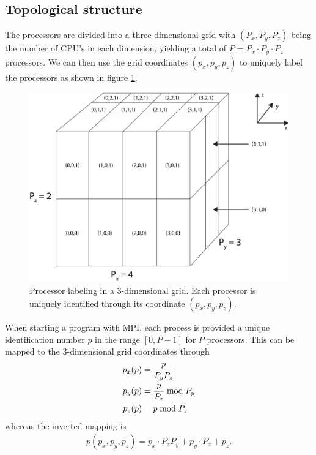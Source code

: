 \subsection{Topological structure}
The processors are divided into a three dimensional grid with $(P_x, P_y, P_z)$ being the number of CPU's in each dimension, yielding a total of $P = P_x\cdot P_y\cdot P_z$ processors. We can then use the grid coordinates $(p_x, p_y, p_z)$ to uniquely label the processors as shown in figure \ref{fig:dsmc_parallelization_2}.
\begin{figure}[h]
\begin{center}
\includegraphics[width=\textwidth, trim=0cm 0cm 0cm 0cm, clip]{DSMC/figures/parallelization_node_configuration.eps}
\end{center}
\caption{Processor labeling in a 3-dimensional grid. Each processor is uniquely identified through its coordinate $(p_x, p_y, p_z)$.}
\label{fig:dsmc_parallelization_2}
\end{figure}
When starting a program with MPI, each process is provided a unique identification number $p$ in the range $[0, P-1]$ for $P$ processors. This can be mapped to the 3-dimensional grid coordinates through
\begin{align}
	\nonumber
	p_x(p) &= {p \over P_yP_z}\\
	\nonumber
	p_y(p) &= {p \over P_z} \bmod P_y\\
	p_z(p) &= p \bmod P_z
\end{align}
whereas the inverted mapping is 
\begin{align}
	p(p_x, p_y, p_z) = p_x\cdot P_zP_y + p_y\cdot P_z + p_z.
\end{align}
